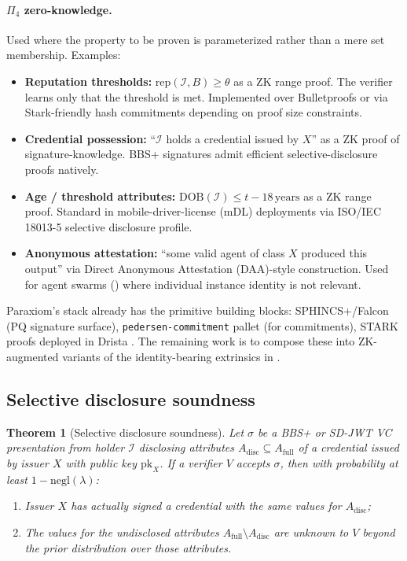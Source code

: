 \documentclass[11pt,a4paper,parskip=half-,DIV=12,headings=standardclasses]{scrartcl}
\theoremstyle{ncthm}
\newtheorem{theorem}{Theorem}[section]
\theoremstyle{ncdef}
\newcommand{\identity}{\mathcal{I}}
\newcommand{\Negl}{\mathrm{negl}}
\begin{document}
\paragraph{$\Pi_4$ zero-knowledge.}
Used where the property to be proven is parameterized rather than a
mere set membership. Examples:
\begin{itemize}
\item \textbf{Reputation thresholds:}\;\;
  $\mathrm{rep}(\identity, B) \geq \theta$ as a ZK range proof. The
  verifier learns only that the threshold is met. Implemented over
  Bulletproofs or via Stark-friendly hash commitments depending on
  proof size constraints.
\item \textbf{Credential possession:}\;\;
  ``$\identity$ holds a credential issued by $X$'' as a ZK proof of
  signature-knowledge. BBS+ signatures admit efficient
  selective-disclosure proofs natively.
\item \textbf{Age / threshold attributes:}\;\;
  $\mathrm{DOB}(\identity) \leq t - 18\,\mathrm{years}$ as a ZK range
  proof. Standard in mobile-driver-license (mDL) deployments via
  ISO/IEC 18013-5 selective disclosure profile.
\item \textbf{Anonymous attestation:}\;\;
  ``some valid agent of class $X$ produced this output'' via Direct
  Anonymous Attestation (DAA)-style construction. Used for agent
  swarms () where individual instance identity is
  not relevant.
\end{itemize}

Paraxiom's stack already has the primitive building blocks:
SPHINCS+/Falcon (PQ signature surface),
\texttt{pedersen-commitment} pallet (for commitments), STARK proofs
deployed in Drista \cite{paraxiom-mods-manifest}. The remaining work
is to compose these into ZK-augmented variants of the
identity-bearing extrinsics in .

\subsection{Selective disclosure soundness}

\begin{theorem}[Selective disclosure soundness]\label{thm:sd-sound}
Let $\sigma$ be a BBS+ or SD-JWT VC presentation from holder
$\identity$ disclosing attributes $A_{\mathrm{disc}} \subseteq A_{\mathrm{full}}$
of a credential issued by issuer $X$ with public key $\mathrm{pk}_X$.
If a verifier $V$ accepts $\sigma$, then with probability at least
$1 - \Negl(\lambda)$:
\begin{enumerate}
\item Issuer $X$ has actually signed a credential with the same
  values for $A_{\mathrm{disc}}$;
\item The values for the undisclosed attributes
  $A_{\mathrm{full}} \setminus A_{\mathrm{disc}}$ are unknown to $V$
  beyond the prior distribution over those attributes.
\end{enumerate}
\end{theorem}
\end{document}
